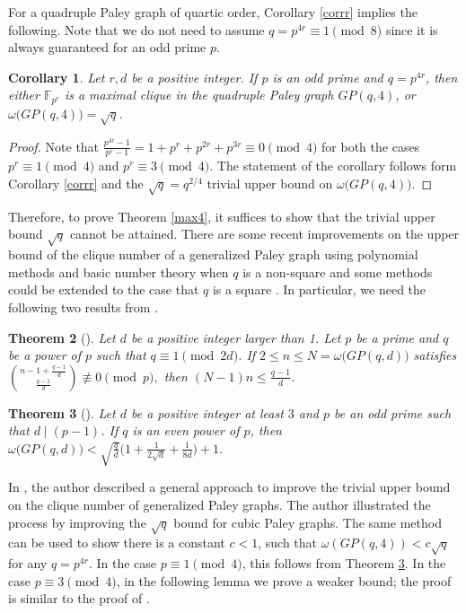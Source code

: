 \documentclass[12pt,oneside]{amsart}
\newtheorem{thm}{Theorem}[section]
\newtheorem{cor}[thm]{Corollary}
\newcommand{\F}{\mathbb{F}}
\begin{document}
For a quadruple Paley graph of quartic order, Corollary \ref{corrr} implies the following.  Note that we do not need to assume $q=p^{4r} \equiv 1 \pmod 8$ since it is always guaranteed for an odd prime $p$.
\begin{cor} \label{cor4}
Let $r,d$ be a positive integer. If $p$ is an odd prime and $q=p^{4r}$, then either $\F_{p^{r}}$ is a maximal clique in the quadruple Paley graph $GP(q,4)$, or $\omega\big(GP(q,4)\big) =\sqrt{q}$.
\end{cor}
\begin{proof}
Note that $\frac{p^{4r}-1}{p^r-1}=1+p^r+p^{2r}+p^{3r} \equiv 0 \pmod 4$ for both the cases $p^r \equiv 1 \pmod 4$ and $p^r \equiv 3 \pmod 4$. The statement of the corollary follows form Corollary \ref{corrr} and the $\sqrt{q}=q^{2/4}$ trivial upper bound on $\omega\big(GP(q,4)\big)$.
\end{proof}
Therefore, to prove Theorem \ref{max4}, it suffices to show that the trivial upper bound $\sqrt{q}$ cannot be attained. There are some recent improvements on the upper bound of the clique number of a generalized Paley graph using polynomial methods and basic number theory when $q$ is a non-square \cite{BSW, HP, Yip, Yip2} and some methods could be extended to the case that $q$ is a square \cite{Yip2}. In particular, we need the following two results from \cite{Yip2}.
\begin{thm}[{\cite[Theorem 5.8]{Yip2}}] \label{t5}
Let $d$ be a positive integer larger than 1. Let $p$ be a prime and $q$ be a power of $p$ such that $q \equiv 1 \pmod{2d}$. If $2 \leq n\leq N=\omega\big(GP(q,d)\big)$ satisfies
$
\binom{n-1+\frac{q-1}{d}}{\frac{q-1}{d}}\not \equiv 0 \pmod p,
$
then $(N-1)n \leq \frac{q-1}{d}$.
\end{thm}

\begin{thm}[{\cite[Theorem 5.12]{Yip2}}]\label{t7}
Let $d$ be a positive integer at least $3$ and $p$ be an odd prime such that $d \mid (p-1)$. If $q$ is an even power of $p$, then $\omega\big(GP(q,d)\big) < \sqrt{\frac{q}{d}} \big(1+\frac{1}{2\sqrt{d}}+\frac{1}{8d}\big)+1.$
\end{thm}

In \cite[Section 5.3]{Yip2}, the author described a general approach to improve the trivial upper bound on the clique number of generalized Paley graphs. The author illustrated the process by improving the $\sqrt{q}$ bound for cubic Paley graphs. The same method can be used to show there is a constant $c<1$, such that $\omega(GP(q,4))<c\sqrt{q}$ for any $q=p^{4r}$. In the case $p \equiv 1 \pmod 4$, this follows from Theorem \ref{t7}. In the case $p \equiv 3 \pmod 4$, in the following lemma we prove a weaker bound; the proof is similar to the proof of \cite[Lemma 5.11]{Yip2}.
\end{document}
